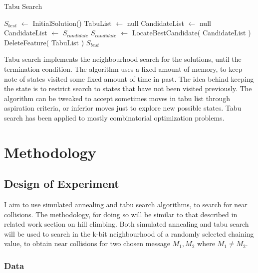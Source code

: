\documentclass[12pt]{artikel3}                  %
\begin{document}
\begin{algorithm}[h]
  \caption{ Tabu Search \cite{00036}}
  \begin{algorithmic}[1]
      \State $S_{best}$ $\gets$ InitialSolution()
      \State TabuList $\gets$ null
        \State CandidateList $\gets$ null
            \State CandidateList $\gets$ $S_{candidate}$
          \EndIf
        \EndFor
        \State $S_{candidate}$ $\gets$ LocateBestCandidate( CandidateList )
            \State DeleteFeature( TabuList )
          \EndWhile
        \EndIf
      \EndWhile 
      \State \Return $S_{best}$
    \EndFunction
  \end{algorithmic}
\end{algorithm}

Tabu search implements the neighbourhood search for the solutions, until the termination condition. The algorithm
uses a fixed amount of memory, to keep note of states visited some fixed amount of time in past. The idea behind
keeping the state is to restrict search to states that have not been visited previously. The algorithm can be
tweaked to accept sometimes moves in tabu list through aspiration criteria, or inferior moves just to explore
new possible states. Tabu search has been applied to mostly combinatorial optimization problems\cite{ 00034, 00035 }.

\section{Methodology}

\subsection{Design of Experiment}
I aim to use simulated annealing and tabu search algorithms, to search for near collisions. The methodology, for doing
so will be similar to that described in related work section on hill climbing. Both simulated annealing and tabu
search will be used to search in the k-bit neighbourhood of a randomly selected chaining value, to obtain near collisions
for two chosen message $M_{1},M_{2}$ where $M_{1} \neq M_{2}$.

  \subsubsection{Data}
  
\end{document}
